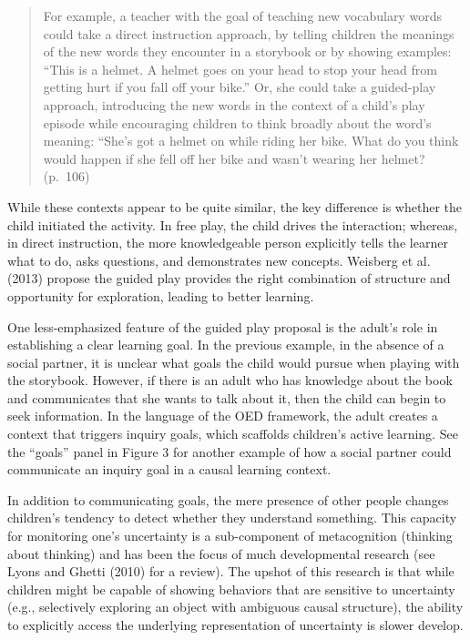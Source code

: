 \documentclass[english,floatsintext,man]{apa6}
\theoremstyle{definition}
\theoremstyle{definition}
\theoremstyle{definition}
\theoremstyle{remark}
\begin{document}
\begin{quote}
For example, a teacher with the goal of teaching new vocabulary words
could take a direct instruction approach, by telling children the
meanings of the new words they encounter in a storybook or by showing
examples: \enquote{This is a helmet. A helmet goes on your head to stop
your head from getting hurt if you fall off your bike.} Or, she could
take a guided-play approach, introducing the new words in the context of
a child's play episode while encouraging children to think broadly about
the word's meaning: ``She's got a helmet on while riding her bike. What
do you think would happen if she fell off her bike and wasn't wearing
her helmet? (p.~106)
\end{quote}

\noindent
While these contexts appear to be quite similar, the key difference is
whether the child initiated the activity. In free play, the child drives
the interaction; whereas, in direct instruction, the more knowledgeable
person explicitly tells the learner what to do, asks questions, and
demonstrates new concepts. Weisberg et al. (2013) propose the guided
play provides the right combination of structure and opportunity for
exploration, leading to better learning.

One less-emphasized feature of the guided play proposal is the adult's
role in establishing a clear learning goal. In the previous example, in
the absence of a social partner, it is unclear what goals the child
would pursue when playing with the storybook. However, if there is an
adult who has knowledge about the book and communicates that she wants
to talk about it, then the child can begin to seek information. In the
language of the OED framework, the adult creates a context that triggers
inquiry goals, which scaffolds children's active learning. See the
\enquote{goals} panel in Figure 3 for another example of how a social
partner could communicate an inquiry goal in a causal learning context.

In addition to communicating goals, the mere presence of other people
changes children's tendency to detect whether they understand something.
This capacity for monitoring one's uncertainty is a sub-component of
metacognition (thinking about thinking) and has been the focus of much
developmental research (see Lyons and Ghetti (2010) for a review). The
upshot of this research is that while children might be capable of
showing behaviors that are sensitive to uncertainty (e.g., selectively
exploring an object with ambiguous causal structure), the ability to
explicitly access the underlying representation of uncertainty is slower
develop.
\end{document}
